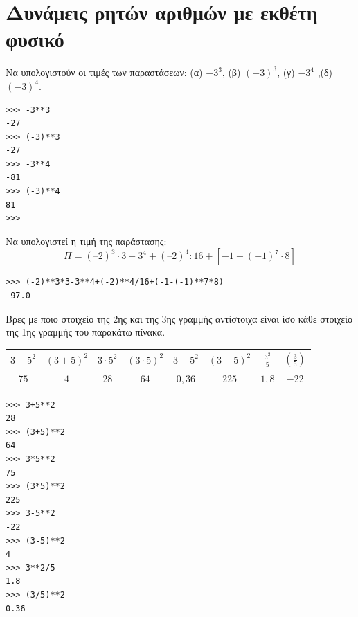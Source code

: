 \section{Δυνάμεις ρητών αριθμών με εκθέτη φυσικό}
\begin{exercise}
Nα υπολογιστούν οι τιμές των παραστάσεων: (α) $-3^3$, (β) $(-3)^3$, (γ) $-3^4$ ,(δ) $(-3)^4$.
\end{exercise}
\begin{lstlisting}
>>> -3**3
-27
>>> (-3)**3
-27
>>> -3**4
-81
>>> (-3)**4
81
>>>
\end{lstlisting}
\begin{exercise}
Nα υπολογιστεί η τιμή της παράστασης: 
$$Π=(–2)^3\cdot 3-3^4+(–2)^4:16+[-1-(-1)^7\cdot 8]$$
\end{exercise}
\begin{lstlisting}
>>> (-2)**3*3-3**4+(-2)**4/16+(-1-(-1)**7*8)
-97.0
\end{lstlisting}
\begin{exercise}
Βρες με ποιο στοιχείο της 2ης και της 3ης γραμμής αντίστοιχα είναι ίσο κάθε στοιχείο της 1ης γραμμής του παρακάτω πίνακα.
\begin{table}[ht]
\begin{tabular}{|c|c|c|c|c|c|c|c|}
$3+5^2$&$(3+5)^2$&$3\cdot 5^2$&$(3\cdot 5)^2$&$3-5^2$&$(3-5)^2$&$\frac{3^2}{5}$&$\left(\frac{3}{5}\right)$\\\hline
$75$&$4$&$28$&$64$&$0,36$&$225$&$1,8$&$-22$\\\hline
\end{tabular}
\end{table}
\end{exercise}
\begin{lstlisting}
>>> 3+5**2
28
>>> (3+5)**2
64
>>> 3*5**2
75
>>> (3*5)**2
225
>>> 3-5**2
-22
>>> (3-5)**2
4
>>> 3**2/5
1.8
>>> (3/5)**2
0.36
\end{lstlisting}


